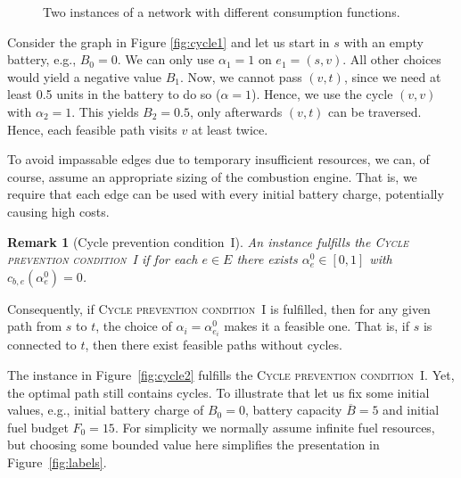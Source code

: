 \documentclass[a4paper]{scrartcl}
\renewcommand{\bar}[1]{\overline{#1}}
\newtheorem{remark}[theorem]{Remark}
\begin{document}
\begin{figure}[ht]
{
}
\caption{Two instances of a network with different consumption functions.}\label{fig:cycle}
\end{figure}


Consider the graph in Figure \ref{fig:cycle1} and let us start  in $s$ with an empty battery, e.g., $B_0=0$. We can only use $\alpha_1=1$ on $e_1=(s,v)$. All other choices would yield a negative value $B_1$. Now, we cannot pass $(v,t)$, since we need at least 0.5 units in the battery to do so ($\alpha=1$). Hence, we use the cycle $(v,v)$ with $\alpha_{2}=1$. This yields $B_2=0.5$, only afterwards $(v,t)$ can be traversed. Hence, each feasible path visits $v$ at least twice.

To avoid impassable edges due to temporary insufficient resources, we can, of course, assume an appropriate sizing of the combustion engine. That is, we require that each edge can be used with every initial battery charge, potentially causing high costs.

\begin{remark}[Cycle prevention condition~I] \label{remark:alpha0}
An instance fulfills the \textsc{Cycle prevention condition~I} if for each $e \in E$ there exists $\alpha^0_e\in[0,1]$ with $c_{b,e}(\alpha^0_e)= 0$.
\end{remark}

Consequently, if \textsc{Cycle prevention condition~I} is fulfilled, then for any given path from $s$ to $t$, the choice of $\alpha_i=\alpha^0_{e_i}$ makes it a feasible one. That is, if $s$ is connected to $t$, then there exist feasible paths without cycles.

The instance in Figure~\ref{fig:cycle2} fulfills the \textsc{Cycle prevention condition~I}. Yet, the optimal path still contains cycles. To illustrate that let us fix some initial values, e.g., initial battery charge of $B_0=0$, battery capacity $\bar{B}=5$ and initial fuel budget $F_0=15$. For simplicity we normally assume infinite fuel resources, but choosing some bounded value here simplifies the presentation in Figure~\ref{fig:labels}. 
\end{document}
